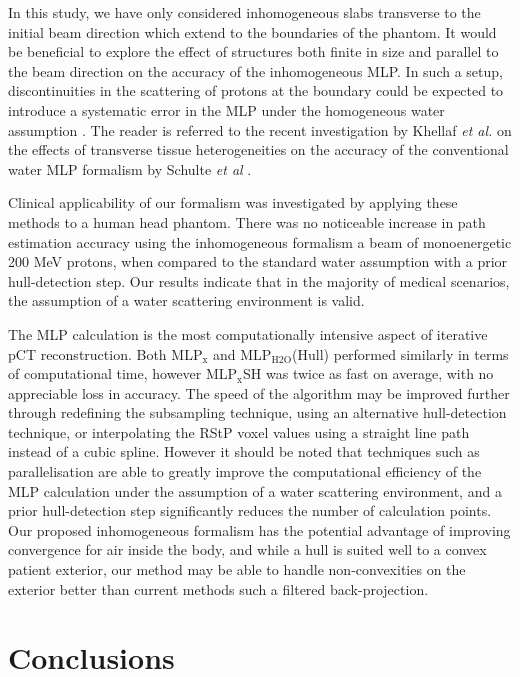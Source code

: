 \documentclass[preprint,times]{elsarticle}
\begin{document}
In this study, we have only considered inhomogeneous slabs transverse to the initial beam direction which extend to the boundaries of the phantom. It would be beneficial to explore the effect of structures both finite in size and parallel to the beam direction on the accuracy of the inhomogeneous MLP. In such a setup, discontinuities in the scattering of protons at the boundary could be expected to introduce a systematic error in the MLP under the homogeneous water assumption \citep{Arbor2015}. The reader is referred to the recent investigation by Khellaf \emph{et al.} \citep{Khellaf2019} on the effects of transverse tissue heterogeneities on the accuracy of the conventional water MLP formalism by Schulte \emph{et al} \citep{penfoldMLP}.

Clinical applicability of our formalism was investigated by applying these methods to a human head phantom. There was no noticeable increase in path estimation accuracy using the inhomogeneous formalism a beam of monoenergetic 200 MeV protons, when compared to the standard water assumption with a prior hull-detection step. Our results indicate that in the majority of medical scenarios, the assumption of a water scattering environment is valid.

The MLP calculation is the most computationally intensive aspect of iterative pCT reconstruction. Both MLP$_\mathrm{x}$ and MLP$_\mathrm{H2O}$(Hull) performed similarly in terms of computational time, however MLP$_\mathrm{x}$SH was twice as fast on average, with no appreciable loss in accuracy. The speed of the algorithm may be improved further through redefining the subsampling technique, using an alternative hull-detection technique, or interpolating the RStP voxel values using a straight line path instead of a cubic spline. However it should be noted that techniques such as parallelisation are able to greatly improve the computational efficiency of the MLP calculation under the assumption of a water scattering environment, and a prior hull-detection step significantly reduces the number of calculation points. Our proposed inhomogeneous formalism has the potential advantage of improving convergence for air inside the body, and while a hull is suited well to a convex patient exterior, our method may be able to handle non-convexities on the exterior better than current methods such a filtered back-projection.



\section{Conclusions}
\end{document}
